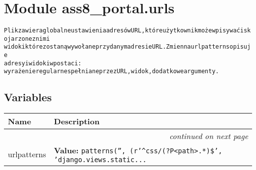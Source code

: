 %
%
%


\section{Module ass8\_portal.urls}

    \label{ass8_portal:urls}
\begin{alltt}

Plik zawiera globalne ustawienia adresów URL, które użytkownik może wpisywać i skojarzone z nimi
widoki które zostaną wywołane przy danym adresie URL. Zmienna urlpatterns opisuje 
adresy i widoki w postaci: 
    wyrażenie regularne spełniane przez URL, widok, dodatkowe argumenty.
\end{alltt}



  \subsection{Variables}

    \vspace{-1cm}
\hspace{\varindent}\begin{longtable}{|p{\varnamewidth}|p{\vardescrwidth}|l}
\cline{1-2}
\cline{1-2} \centering \textbf{Name} & \centering \textbf{Description}& \\
\cline{1-2}
\endhead\cline{1-2}\multicolumn{3}{r}{\small\textit{continued on next page}}\\\endfoot\cline{1-2}
\endlastfoot\raggedright u\-r\-l\-p\-a\-t\-t\-e\-r\-n\-s\- & \raggedright \textbf{Value:} 
{\tt patterns('', (r'{\textasciicircum}css/(?P{\textless}path{\textgreater}.*)\$', 'django.views.static\texttt{...}}&\\
\cline{1-2}
\end{longtable}

